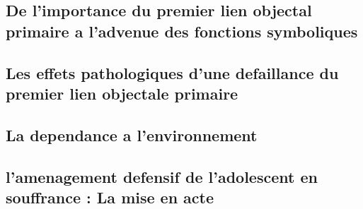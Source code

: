 \documentclass[a4paper]{report}
\begin{document}
\subsection{De l'importance du premier lien objectal primaire a l'advenue des fonctions symboliques}
\subsection{Les effets pathologiques d'une defaillance du premier lien objectale primaire}
\subsection{La dependance a l'environnement}
\subsection{l'amenagement defensif de l'adolescent en souffrance : La mise en acte}
\end{document}
